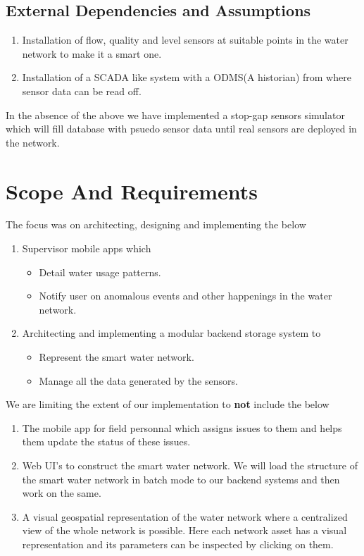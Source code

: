 \documentclass[11pt]{report} %
\begin{document}
\section{External Dependencies and Assumptions}
\begin{enumerate}
\item
Installation of flow, quality and level sensors at suitable points in the water network to make it a smart one. 
\item
Installation of a SCADA like system with a ODMS(A historian) from where sensor data can be read off.
\end{enumerate}
In the absence of the above we have implemented a stop-gap sensors simulator which will fill database with psuedo sensor data until real sensors are deployed in the network.


\chapter{Scope And Requirements}

The focus was on architecting, designing and implementing the below
\begin{enumerate}
\item
Supervisor mobile apps which
\begin{itemize}
\item
Detail water usage patterns.
\item
Notify user on anomalous events and other happenings in the water network.
\end{itemize}
\item
Architecting and implementing a modular backend storage system to
\begin{itemize}
\item
Represent the smart water network.
\item
Manage all the data generated by the sensors.\\
\end{itemize}
\end{enumerate}
We are limiting the extent of our implementation to \textbf{not} include the below
\begin{enumerate}
\label{itm:todo}
\item
The mobile app for field personnal which assigns issues to them and helps them update the status of these issues.
\item
Web UI's to construct the smart water network. We will load the structure of the smart water network in batch mode to our backend systems and then work on the same.
\item
A visual geospatial representation of the water network where a centralized view of the whole network is possible. Here each network asset has a visual representation and its parameters can be inspected by clicking on them.
\end{enumerate}
\end{document}
